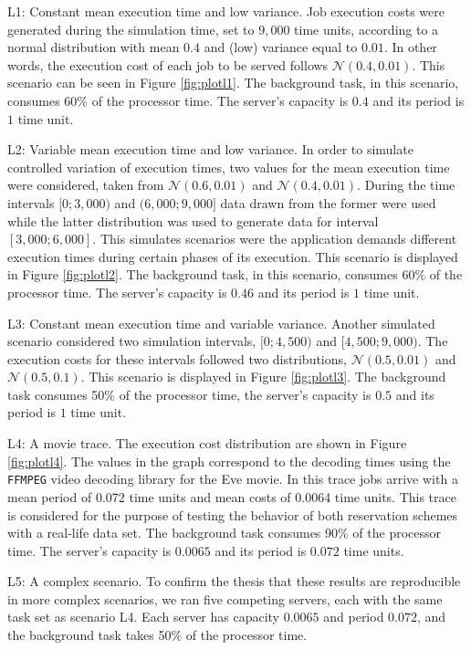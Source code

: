 \documentclass[times, 10pt,twocolumn]{article}
\begin{document}
\begin{description}
\item L1: Constant mean execution time and low variance. Job execution
  costs were generated during the simulation time, set to $9,000$ time
  units, according to a normal distribution with mean $0.4$ and (low)
  variance equal to $0.01$. In other words, the execution cost of each
  job to be served follows $\mathcal{N}(0.4,0.01)$. This scenario can
  be seen in Figure \ref{fig:plotl1}. The background task, in this
  scenario, consumes 60\% of the processor time. The server's capacity
  is $0.4$ and its period is $1$ time unit.
\item L2: Variable mean execution time and low variance.  In order to
  simulate controlled variation of execution times, two values for the
  mean execution time were considered, taken from
  $\mathcal{N}(0.6,0.01)$ and $\mathcal{N}(0.4,0.01)$. During the time
  intervals $[0;3,000)$ and $(6,000;9,000]$ data drawn from the former
  were used while the latter distribution was used to generate data
  for interval $[3,000;6,000]$. This simulates scenarios were the
  application demands different execution times during certain phases
  of its execution. This scenario is displayed in Figure
  \ref{fig:plotl2}. The background task, in this scenario, consumes
  60\% of the processor time. The server's capacity is $0.46$ and its
  period is $1$ time unit.
\item L3: Constant mean execution time and variable variance.  Another
  simulated scenario considered two simulation intervals, $[0;4,500)$
  and $[4,500;9,000)$.  The execution costs for these intervals
  followed two distributions, $\mathcal{N}(0.5,0.01)$ and
  $\mathcal{N}(0.5,0.1)$. This scenario is displayed in Figure
  \ref{fig:plotl3}. The background task consumes 50\% of the processor
  time, the server's capacity is $0.5$ and its period is $1$ time unit.
\item L4: A movie trace. The execution cost distribution are shown in
  Figure \ref{fig:plotl4}. The values in the graph correspond to the
  decoding times using the \texttt{FFMPEG} video decoding library for
  the Eve movie. In this trace jobs arrive with a mean period of 0.072
  time units and mean costs of 0.0064 time units. This trace is
  considered for the purpose of testing the behavior of both
  reservation schemes with a real-life data set. The background task
  consumes 90\% of the processor time. The server's capacity is
  $0.0065$ and its period is $0.072$ time units.
\item L5: A complex scenario. To confirm the thesis that these results
  are reproducible in more complex scenarios, we ran five competing
  servers, each with the same task set as scenario L4. Each server has
  capacity $0.0065$ and period $0.072$, and the background task takes
  50\% of the processor time.
\end{description}
\end{document}
